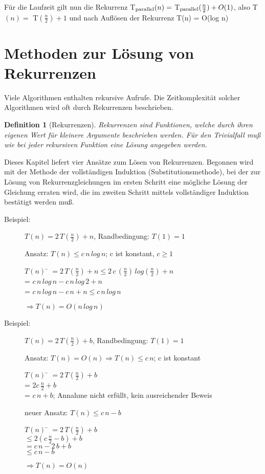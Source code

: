 \documentclass{scrreprt}%
\theoremstyle{break}
\newtheorem{definition}{Definition}
\begin{document}
$$  $$

Für die Laufzeit gilt nun die Rekurrenz T$_{\textup{parallel}}(n) =$ T$_{\textup{parallel}}(\frac{n}{2}) + O(1)$,
also T$(n)=$ T$(\frac{n}{2})+1$ und nach Auflösen der Rekurrenz T(n) = O(log n)

\section{Methoden zur Lösung von Rekurrenzen}
Viele Algorithmen enthalten rekursive Aufrufe. Die Zeitkomplexität solcher Algorithmen wird oft durch Rekurrenzen beschrieben.
\begin{definition}[Rekurrenzen]
Rekurrenzen sind Funktionen, welche durch ihren eigenen Wert für kleinere Argumente beschrieben werden. Für den Trivialfall muß wie
bei jeder rekursiven Funktion eine Lösung angegeben werden.
\end{definition}
Dieses Kapitel liefert vier Ansätze zum Lösen von Rekurrenzen.
%
%
Begonnen wird mit der Methode der vollständigen Induktion (Substitutionsmethode),
bei der zur Lösung von Rekurrenzgleichungen im ersten Schritt eine mögliche Lösung der Gleichung erraten wird,
die im zweiten Schritt mittels vollständiger Induktion bestätigt werden muß.		

	\begin{description}
		\item [Beispiel:] $T(n) = 2\, T\left(\frac{n}{2}\right) + n$, Randbedingung: $T(1)=1$

		Ansatz: $T(n) \leq c\, n\, log\,n$; c ist konstant, $c \geq 1$
		\begin{tabbing}
			$T(n)$ \= $= 2\, T\left(\frac{n}{2}\right)+n\leq 2\, c\,\left(\frac{n}{2}\right)\, log\left(\frac{n}{2}\right)+n$\\
			\> = $c\, n\, log\, n-c\, n\, log\,2+n$\\
			\> = $c\, n\, log\, n-c\, n+n \leq c\, n\, log\, n$\\
		\end{tabbing}
		$\Rightarrow T(n)=O(n\, log\,n)$
	\end{description}

	\begin{description}
		\item [Beispiel:] $T(n) = 2\, T\left(\frac{n}{2}\right) + b$, Randbedingung: $T(1)=1$

		Ansatz: $T(n)=O(n)\Rightarrow T(n)\leq c\, n$; c ist konstant
		\begin{tabbing}
			$T(n)$ \= $= 2\, T(\frac{n}{2})+b$\\
			\> = $2c\, \frac{n}{2} +b$\\
			\> = $c\, n+b$; Annahme nicht erfüllt, kein ausreichender Beweis
		\end{tabbing}
		neuer Ansatz: $T(n)\leq c\, n-b$
		\begin{tabbing}
			$T(n)$ \= $=2\, T\left(\frac{n}{2} \right)+b$\\
			\> $\leq 2\left(c\, \frac{n}{2}-b\right)+b$\\
			\> $=c\, n-2\, b+b$\\
			\> $\leq c\, n-b$
		\end{tabbing}
		$\Rightarrow T(n)=O(n)$
	\end{description}
			
\end{document}
